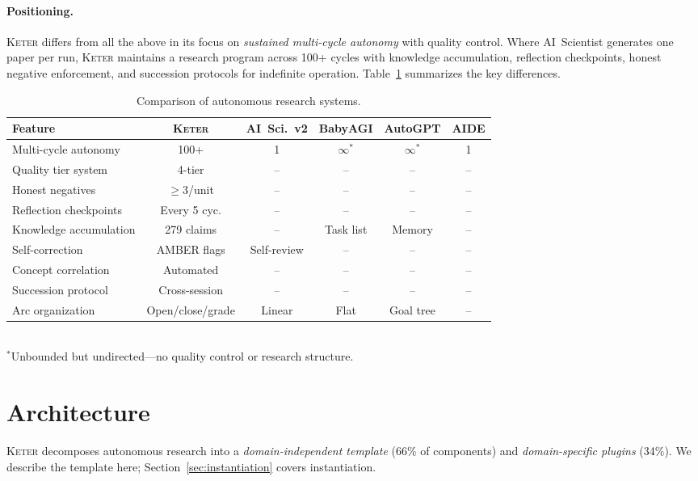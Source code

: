 \documentclass[11pt,a4paper]{article}
\newcommand{\keter}{\textsc{Keter}}
\begin{document}
\paragraph{Positioning.}
\keter{} differs from all the above in its focus on \emph{sustained multi-cycle
autonomy} with quality control. Where AI~Scientist generates one paper per run,
\keter{} maintains a research program across 100+ cycles with knowledge accumulation,
reflection checkpoints, honest negative enforcement, and succession protocols for
indefinite operation. Table~\ref{tab:comparison} summarizes the key differences.

\begin{table}[t]
\centering
\caption{Comparison of autonomous research systems.}
\label{tab:comparison}
\small
\begin{tabular}{@{}lccccc@{}}
\toprule
Feature & \keter{} & AI~Sci.~v2 & BabyAGI & AutoGPT & AIDE \\
\midrule
Multi-cycle autonomy & 100+ & 1 & $\infty^*$ & $\infty^*$ & 1 \\
Quality tier system  & 4-tier & -- & -- & -- & -- \\
Honest negatives     & $\geq$3/unit & -- & -- & -- & -- \\
Reflection checkpoints & Every 5 cyc. & -- & -- & -- & -- \\
Knowledge accumulation & 279 claims & -- & Task list & Memory & -- \\
Self-correction      & AMBER flags & Self-review & -- & -- & -- \\
Concept correlation  & Automated & -- & -- & -- & -- \\
Succession protocol  & Cross-session & -- & -- & -- & -- \\
Arc organization     & Open/close/grade & Linear & Flat & Goal tree & -- \\
\bottomrule
\end{tabular}
\\[2pt]
{\footnotesize $^*$Unbounded but undirected---no quality control or research structure.}
\end{table}

\section{Architecture}
\label{sec:architecture}

\keter{} decomposes autonomous research into a \emph{domain-independent template}
(66\% of components) and \emph{domain-specific plugins} (34\%). We describe the
template here; Section~\ref{sec:instantiation} covers instantiation.
\end{document}
